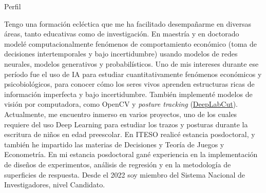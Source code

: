 \documentclass{resume} %
\begin{document}
\begin{rSection}{Perfil}
    
    Tengo una formación ecléctica que me ha facilitado desempañarme en diversas áreas, tanto educativas como de investigación. En maestría y en doctorado modelé computacionalmente fenómenos de comportamiento económico (toma de decisiones intertemporales y bajo incertidumbre) usando modelos de redes neurales, modelos generativos y probabilísticos. Uno de mis intereses durante ese período fue el uso de IA para estudiar cuantitativamente fenómenos económicos y psicobiológicos, para conocer cómo los seres vivos aprenden estructuras ricas de información imperfecta y bajo incertidumbre. También implementé modelos de visión por computadora, como OpenCV y \textit{posture tracking} (\href{http://www.mackenziemathislab.org/deeplabcut}{DeepLabCut}). Actualmente, me encuentro inmerso en varios proyectos, uno de los cuales requiere del uso Deep Learning para estudiar los trazos y posturas durante la escritura de niños en edad preescolar. En ITESO realicé estancia posdoctoral, y también he impartido las materias de Decisiones y Teoría de Juegos y Econometría. En mi estancia posdoctoral gané experiencia en la implementación de diseños de experimentos, análisis de regresión y en la metodología de superficies de respuesta. Desde el 2022 soy miembro del Sistema Nacional de Investigadores, nivel Candidato.  %
    
\end{rSection}
\end{document}

